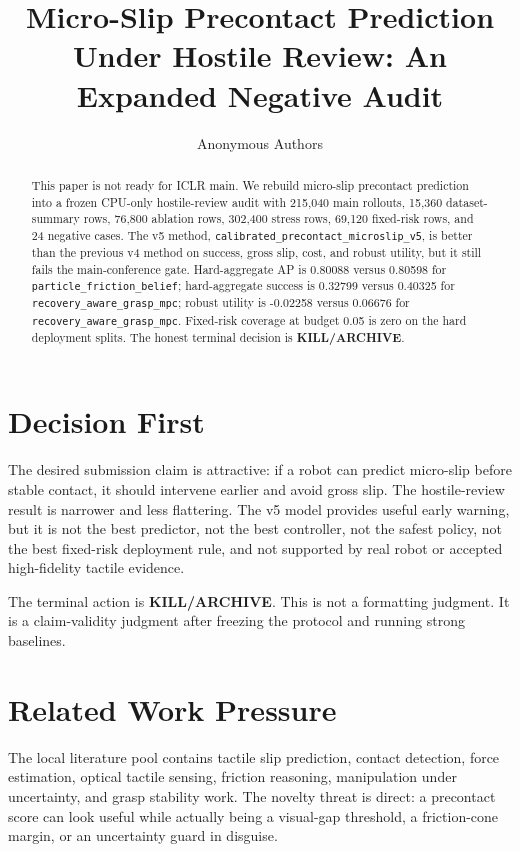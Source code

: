 \documentclass{article}
\title{Micro-Slip Precontact Prediction Under Hostile Review: An Expanded Negative Audit}
\author{Anonymous Authors}
\begin{document}
\maketitle

\begin{abstract}
This paper is not ready for ICLR main. We rebuild micro-slip precontact prediction into a frozen CPU-only hostile-review audit with 215,040 main rollouts, 15,360 dataset-summary rows, 76,800 ablation rows, 302,400 stress rows, 69,120 fixed-risk rows, and 24 negative cases. The v5 method, \texttt{calibrated\_precontact\_microslip\_v5}, is better than the previous v4 method on success, gross slip, cost, and robust utility, but it still fails the main-conference gate. Hard-aggregate AP is 0.80088 versus 0.80598 for \texttt{particle\_friction\_belief}; hard-aggregate success is 0.32799 versus 0.40325 for \texttt{recovery\_aware\_grasp\_mpc}; robust utility is -0.02258 versus 0.06676 for \texttt{recovery\_aware\_grasp\_mpc}. Fixed-risk coverage at budget 0.05 is zero on the hard deployment splits. The honest terminal decision is \textbf{KILL/ARCHIVE}.
\end{abstract}

\section{Decision First}
The desired submission claim is attractive: if a robot can predict micro-slip before stable contact, it should intervene earlier and avoid gross slip. The hostile-review result is narrower and less flattering. The v5 model provides useful early warning, but it is not the best predictor, not the best controller, not the safest policy, not the best fixed-risk deployment rule, and not supported by real robot or accepted high-fidelity tactile evidence.

The terminal action is \textbf{KILL/ARCHIVE}. This is not a formatting judgment. It is a claim-validity judgment after freezing the protocol and running strong baselines.

\section{Related Work Pressure}
The local literature pool contains tactile slip prediction, contact detection, force estimation, optical tactile sensing, friction reasoning, manipulation under uncertainty, and grasp stability work. The novelty threat is direct: a precontact score can look useful while actually being a visual-gap threshold, a friction-cone margin, or an uncertainty guard in disguise. \citep{r103390robotics8040085,r101186s40648024002733,r101109lra20223205768,r101109icra4663920229812186,r101299jsmermd2005682,r101017s0950268825100319} \citep{r1010800020754320222164628,r101109tim20233343795,r101089soro20200213,r101089soro20180172,r101109icra4663920229811832,r103390s17122762} \citep{r103390s19224925,r101007s4082001902887,r101126sciroboticsadq5046,r101109lra20243387111,r103390machines9060119,r103390s18020326}
\end{document}
